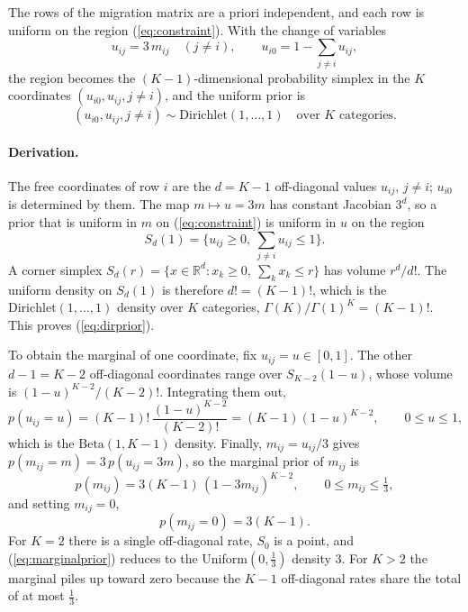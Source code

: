 \documentclass[11pt,a4paper]{article}
\newcommand{\Dir}{\mathrm{Dirichlet}}
\newcommand{\Beta}{\mathrm{Beta}}
\newcommand{\1}{\mathbf{1}}
\begin{document}
The rows of the migration matrix are a priori independent, and each row is
uniform on the region (\ref{eq:constraint}). With the change of variables
\[
u_{ij} = 3\,m_{ij}\quad (j\neq i), \qquad u_{i0} = 1-\sum_{j\neq i} u_{ij},
\]
the region becomes the $(K-1)$-dimensional probability simplex in the $K$
coordinates $(u_{i0}, u_{ij}, j\neq i)$, and the uniform prior is
\begin{equation}
(u_{i0}, u_{ij}, j\neq i) \sim \Dir(1,\ldots,1) \quad\text{over } K \text{ categories}.
\label{eq:dirprior}
\end{equation}

\paragraph{Derivation.}
The free coordinates of row $i$ are the $d=K-1$ off-diagonal values
$u_{ij}$, $j\neq i$; $u_{i0}$ is determined by them. The map $m\mapsto u=3m$
has constant Jacobian $3^{d}$, so a prior that is uniform in $m$ on
(\ref{eq:constraint}) is uniform in $u$ on the region
\[
S_d(1) = \Big\{u_{ij}\ge 0,\ \textstyle\sum_{j\neq i}u_{ij}\le 1\Big\}.
\]
A corner simplex $S_d(r)=\{x\in\mathbb{R}^d: x_k\ge 0,\ \sum_k x_k\le r\}$
has volume $r^d/d!$. The uniform density on $S_d(1)$ is therefore $d! =
(K-1)!$, which is the $\Dir(1,\ldots,1)$ density over $K$ categories,
$\Gamma(K)/\Gamma(1)^K = (K-1)!$. This proves (\ref{eq:dirprior}).

To obtain the marginal of one coordinate, fix $u_{ij}=u\in[0,1]$. The other
$d-1=K-2$ off-diagonal coordinates range over $S_{K-2}(1-u)$, whose volume is
$(1-u)^{K-2}/(K-2)!$. Integrating them out,
\[
p(u_{ij}=u) = (K-1)!\,\frac{(1-u)^{K-2}}{(K-2)!} = (K-1)(1-u)^{K-2},
\qquad 0\le u\le 1,
\]
which is the $\Beta(1,K-1)$ density. Finally, $m_{ij}=u_{ij}/3$ gives
$p(m_{ij}=m) = 3\,p(u_{ij}=3m)$, so the marginal prior of $m_{ij}$ is
\begin{equation}
p(m_{ij}) = 3(K-1)\,(1-3m_{ij})^{K-2}, \qquad 0\le m_{ij}\le \tfrac13,
\label{eq:marginalprior}
\end{equation}
and setting $m_{ij}=0$,
\begin{equation}
\boxed{\;p(m_{ij}=0) = 3(K-1).\;}
\label{eq:prior0}
\end{equation}
For $K=2$ there is a single off-diagonal rate, $S_{0}$ is a point, and
(\ref{eq:marginalprior}) reduces to the Uniform$(0,\frac13)$ density $3$.
For $K>2$ the marginal piles up toward zero because the $K-1$ off-diagonal rates
share the total of at most $\frac13$.
\end{document}
